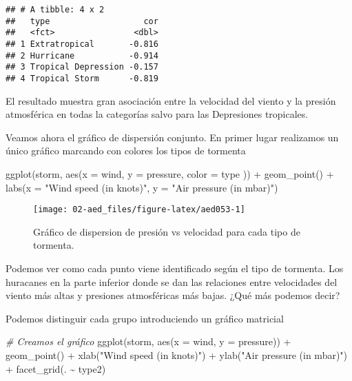 \documentclass[
]{book}
\newenvironment{Shaded}{\begin{snugshade}}{\end{snugshade}}
\newcommand{\AttributeTok}[1]{\textcolor[rgb]{0.77,0.63,0.00}{#1}}
\newcommand{\CommentTok}[1]{\textcolor[rgb]{0.56,0.35,0.01}{\textit{#1}}}
\newcommand{\FunctionTok}[1]{\textcolor[rgb]{0.00,0.00,0.00}{#1}}
\newcommand{\NormalTok}[1]{#1}
\newcommand{\SpecialCharTok}[1]{\textcolor[rgb]{0.00,0.00,0.00}{#1}}
\newcommand{\StringTok}[1]{\textcolor[rgb]{0.31,0.60,0.02}{#1}}
\begin{document}
\begin{verbatim}
## # A tibble: 4 x 2
##   type                   cor
##   <fct>                <dbl>
## 1 Extratropical       -0.816
## 2 Hurricane           -0.914
## 3 Tropical Depression -0.157
## 4 Tropical Storm      -0.819
\end{verbatim}

El resultado muestra gran asociación entre la velocidad del viento y la presión atmosférica en todas la categorías salvo para las Depresiones tropicales.

Veamos ahora el gráfico de dispersión conjunto. En primer lugar realizamos un único gráfico marcando con colores los tipos de tormenta

\begin{Shaded}
\begin{Highlighting}[]
\FunctionTok{ggplot}\NormalTok{(storm, }\FunctionTok{aes}\NormalTok{(}\AttributeTok{x =}\NormalTok{ wind, }\AttributeTok{y =}\NormalTok{ pressure, }\AttributeTok{color =}\NormalTok{ type )) }\SpecialCharTok{+} 
  \FunctionTok{geom\_point}\NormalTok{() }\SpecialCharTok{+} 
  \FunctionTok{labs}\NormalTok{(}\AttributeTok{x =} \StringTok{"Wind speed (in knots)"}\NormalTok{, }\AttributeTok{y =} \StringTok{"Air pressure (in mbar)"}\NormalTok{)}
\end{Highlighting}
\end{Shaded}

\begin{figure}

{\centering \texttt{[image: 02-aed\_files/figure-latex/aed053-1]} 

}

\caption{Gráfico de dispersion de presión vs velocidad para cada tipo de tormenta.}\label{fig:aed053}
\end{figure}

Podemos ver como cada punto viene identificado según el tipo de tormenta. Los huracanes en la parte inferior donde se dan las relaciones entre velocidades del viento más altas y presiones atmosféricas más bajas. ¿Qué más podemos decir?

Podemos distinguir cada grupo introduciendo un gráfico matricial

\begin{Shaded}
\begin{Highlighting}[]
\CommentTok{\# Creamos el gráfico}
\FunctionTok{ggplot}\NormalTok{(storm, }\FunctionTok{aes}\NormalTok{(}\AttributeTok{x =}\NormalTok{ wind, }\AttributeTok{y =}\NormalTok{ pressure))  }\SpecialCharTok{+}
  \FunctionTok{geom\_point}\NormalTok{() }\SpecialCharTok{+} 
  \FunctionTok{xlab}\NormalTok{(}\StringTok{"Wind speed (in knots)"}\NormalTok{) }\SpecialCharTok{+}
  \FunctionTok{ylab}\NormalTok{(}\StringTok{"Air pressure (in mbar)"}\NormalTok{) }\SpecialCharTok{+}
  \FunctionTok{facet\_grid}\NormalTok{(. }\SpecialCharTok{\textasciitilde{}}\NormalTok{ type2) }
\end{Highlighting}
\end{Shaded}
\end{document}
